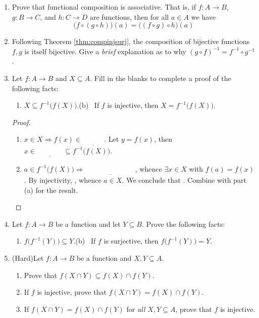 \begin{exercises}
\begin{enumerate}
	  
		\item Prove that functional composition is associative. That is, if $f:A\to B$, $g:B\to C$, and $h:C\to D$ are functions, then for all $a\in A$ we have
			\[
				\bigl(f\circ(g\circ h)\bigr)(a) = \bigl((f\circ g)\circ h\bigr)(a)
			\]
	  
	  \item Following Theorem \ref{thm:compinjsurj}, the composition of bijective functions $f,g$ is itself bijective. Give a \emph{brief} explanation as to why $(g\circ f)^{-1}=f^{-1}\circ g^{-1}$.
	
		
		\item Let $f:A\to B$ and $X\subseteq A$. Fill in the blanks to complete a proof of the following facts:
		\begin{enumerate}
	  	\item $X\subseteq f^{-1}\bigl(f(X)\bigr)$.\qquad\qquad\qquad (b) \ If $f$ is injective, then $X=f^{-1}\bigl(f(X)\bigr)$.
		\end{enumerate}
		\begin{proof}
			\begin{enumerate}
		  	\item $x\in X\Longrightarrow f(x)\in \underline{\phantom{f(X)}}$. Let $y=f(x)$, then $x\in \underline{\phantom{f^{-1}\bigl(\{y\}\bigr)}} \subseteq f^{-1}\bigl(f(X)\bigr)$.
		  	\item $a\in f^{-1}\bigl(f(X)\bigr) \Longrightarrow \underline{\phantom{f(a)\in f(X)}}$, whence $\exists x\in X$ with $f(a)=f(x)$. By injectivity, \underline{\phantom{$x=a$}}, whence $a\in X$. We conclude that \underline{}. Combine with part (a) for the result.\qedhere
			\end{enumerate}
		\end{proof}
		
	
		\item Let $f:A\to B$ be a function and let $Y\subseteq B$. Prove the following facts:
		\begin{enumerate}
	    \item $f\bigl(f^{-1}(Y)\bigr) \subseteq Y$.\qquad\qquad\qquad (b) \ If $f$ is surjective, then $f\bigl(f^{-1}(Y)\bigr)=Y$.
		\end{enumerate}
	  
	
	
		\item (Hard)\lstsp Let $f:A\to B$ be a function and $X,Y\subseteq A$.
		\begin{enumerate}
		  \item Prove that $f(X\cap Y)\subseteq f(X)\cap f(Y)$.
		  \item If $f$ is injective, prove that $f(X\cap Y) = f(X) \cap f(Y)$.
		  \item If $f(X\cap Y)=f(X)\cap f(Y)$ for \emph{all} $X,Y\subseteq A$, prove that $f$ is injective.
		\end{enumerate}
		

\end{enumerate}
\end{exercises}
